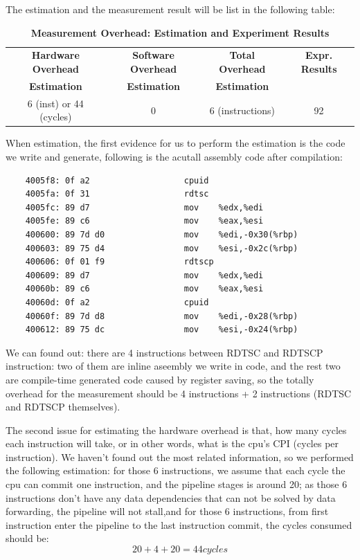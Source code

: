 The estimation and the measurement result will be list in the following table:

\begin{table}[ht]
  \centering
  \caption{\textbf{Measurement Overhead: Estimation and Experiment Results}}
  \begin{threeparttable}
  \begin{tabular}{cccc}
  \hline
      \textbf{Hardware Overhead} & \textbf{Software Overhead } & \textbf{Total Overhead} & \textbf{Expr. Results} \\
      \textbf{Estimation}       &  \textbf{Estimation}         & \textbf{Estimation}  &     \\
  \hline
  6 (inst) or 44 (cycles) & 0 & 6 (instructions) & 92 \\
  \hline
  \end{tabular}
  \end{threeparttable}
  \label{measurement_overhead_table}
\end{table}

When estimation, the first evidence for us to perform the estimation is the code we write and generate, following is the acutall assembly code after compilation:

\begin{lstlisting}
    4005f8:	0f a2                	cpuid
    4005fa:	0f 31                	rdtsc
    4005fc:	89 d7                	mov    %edx,%edi
    4005fe:	89 c6                	mov    %eax,%esi
    400600:	89 7d d0             	mov    %edi,-0x30(%rbp)
    400603:	89 75 d4             	mov    %esi,-0x2c(%rbp)
    400606:	0f 01 f9             	rdtscp
    400609:	89 d7                	mov    %edx,%edi
    40060b:	89 c6                	mov    %eax,%esi
    40060d:	0f a2                	cpuid
    40060f:	89 7d d8             	mov    %edi,-0x28(%rbp)
    400612:	89 75 dc             	mov    %esi,-0x24(%rbp)
\end{lstlisting}

We can found out: there are 4 instructions between RDTSC and RDTSCP instruction: two of them are inline aseembly we write in code, and the rest two are compile-time generated code caused by
register saving, so the totally overhead for the measurement should be 4 instructions + 2 instructions (RDTSC and RDTSCP themselves).

The second issue for estimating the hardware overhead is that, how many cycles each instruction will take, or in other words, what is the cpu's CPI (cycles per instruction). We haven't found out
the most related information, so we performed the following estimation: for those 6 instructions, we assume that each cycle the cpu can commit one instruction, and the pipeline stages is around 20;
as those 6 instructions don't have any data dependencies that can not be solved by data forwarding, the pipeline will not stall,and for those 6 instructions, from first instruction enter the pipeline
to the last instruction commit, the cycles consumed should be:
    $$ 20 + 4 + 20 = 44 cycles $$

